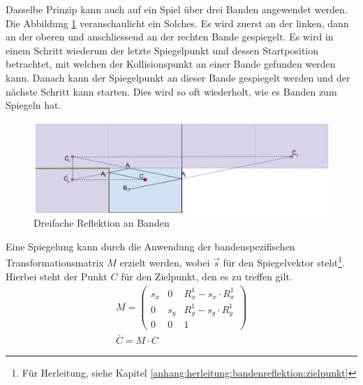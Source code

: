 Dasselbe Prinzip kann auch auf ein Spiel über drei Banden angewendet werden. Die Abbildung \ref{fig:Dreifache Reflektion an Banden} veranschaulicht
ein Solches. Es wird zuerst an der linken, dann an der oberen und anschliessend an der rechten Bande gespiegelt.
Es wird in einem Schritt wiederum der letzte Spiegelpunkt und dessen Startposition betrachtet, mit welchen der Kollisionspunkt
an einer Bande gefunden werden kann. Danach kann der Spiegelpunkt an dieser Bande gespiegelt werden und der nächste
Schritt kann starten. Dies wird so oft wiederholt, wie es Banden zum Spiegeln hat.
\begin{figure}[h!]
    \begin{center}
        \includegraphics[width=1\linewidth]{../common/03_billiard_ai/resources/54_rail_reflection_3.png}
    \end{center}
    \caption{Dreifache Reflektion an Banden}
    \label{fig:Dreifache Reflektion an Banden}
\end{figure}

Eine Spiegelung kann durch die Anwendung der bandenspezifischen Transformationsmatrix $M$ erzielt werden, wobei $\vec{s}$
für den Spiegelvektor steht\footnote{Für Herleitung, siehe Kapitel \ref{anhang:herleitung:bandenreflektion:zielpunkt}}.
Hierbei steht der Punkt $C$ für den Zielpunkt, den es zu treffen gilt.
\begin{align}
    M = \begin{pmatrix}s_x & 0 & R^1_x - s_x \cdot R^1_x \\ 0 & s_y & R^1_y - s_y \cdot R^1_y \\ 0 & 0 & 1\end{pmatrix}\\
    \bar{C} = M \cdot C
\end{align}

